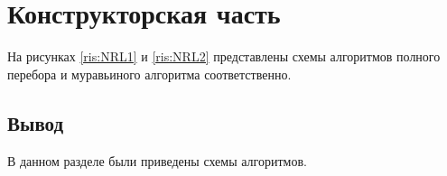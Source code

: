 \chapter{Конструкторская часть}
На рисунках \ref{ris:NRL1} и \ref{ris:NRL2} представлены схемы алгоритмов полного перебора и муравьиного алгоритма соответственно.
\begin{center}	
	\centering
	\def\svgwidth{12cm}
	
	\label{ris:NRL1}
\end{center}
\begin{center}	
	\centering
	\def\svgwidth{16cm}
	
	\label{ris:NRL2}
\end{center}
\section*{\hsp Вывод}
В данном разделе были приведены схемы алгоритмов.